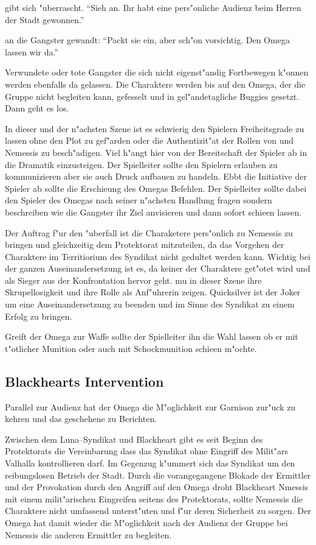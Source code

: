 \xlsn{} gibt sich "uberrascht. "`Sieh an. Ihr habt eine pers"onliche Audienz beim Herren der Stadt gewonnen."'

\xlsn{} an die Gangster gewandt: "`Packt sie ein, aber sch"on vorsichtig. Den Omega lassen wir da."'

Verwundete oder tote Gangster die sich nicht eigenst"andig Fortbewegen k"onnen werden ebenfalls da gelassen. Die Charaktere werden bis auf den Omega, der die Gruppe nicht begleiten kann, gefesselt und in gel"andetagliche Buggies gesetzt. Dann geht es los.

\begin{remarks}
	In dieser und der n"achsten Szene ist es schwierig den Spielern Freiheitsgrade zu lassen ohne den Plot zu gef"arden oder die Authentizit"at der Rollen von \xl{} und Nemessis zu besch"adigen. Viel h"angt hier von der Bereitschaft der Spieler ab in die Dramatik einzusteigen. Der Spielleiter sollte den Spielern erlauben zu kommunizieren aber sie auch Druck aufbauen zu handeln. Ebbt die Initiative der Spieler ab sollte \xl{} die Erschie\3ung des Omegas Befehlen. Der Spielleiter sollte dabei den Spieler des Omegas nach seiner n"achsten Handlung fragen sondern beschreiben wie die Gangster ihr Ziel anvisieren und dann sofort schie\3en lassen.

	Der Auftrag f"ur den "uberfall ist die Charaketere pers"onlich zu Nemessis zu bringen und gleichzeitig dem Protektorat mitzuteilen, da\3 das Vorgehen der Charaktere im Territiorium des Syndikat nicht gedultet werden kann. Wichtig bei der ganzen Auseinandersetzung ist es, da\3 keiner der Charaktere get"otet wird und \xl{} als Sieger aus der Konfrontation hervor geht. \xl{} mu\3 in dieser Szene ihre Skrupellosigkeit und ihre Rolle als Anf"uhrerin zeigen. Quicksilver ist der Joker um eine Auseinandersetzung zu beenden und im Sinne des Syndikat zu einem Erfolg zu bringen.

	Greift der Omega zur Waffe sollte der Spielleiter ihn die Wahl lassen ob er mit t"otlicher Munition oder auch mit Schockmunition schie\3en m"ochte.
\end{remarks}


\subsection{Blackhearts Intervention}

Parallel zur Audienz hat der Omega die M"oglichkeit zur Garnison zur"uck zu kehren und das geschehene zu Berichten. 

Zwischen dem Luna--Syndikat und Blackheart gibt es seit Beginn des Protektorats die Vereinbarung dass das Syndikat ohne Eingriff des Milit"ars Valhalla kontrollieren darf. Im Gegenzug k"ummert sich das Syndikat um den reibungslosen Betrieb der Stadt. Durch die  vorangegangene Blokade der Ermittler und der Provokation durch den Angriff auf den Omega droht Blackheart Nmessis mit einem milit"arischen Eingreifen seitens des Protektorats, sollte Nemessis die Charaktere nicht umfassend unterst"uten und f"ur deren Sicherheit zu sorgen. Der Omega hat damit wieder die M"oglichkeit nach der Audienz der Gruppe bei Nemessis die anderen Ermittler zu begleiten.



